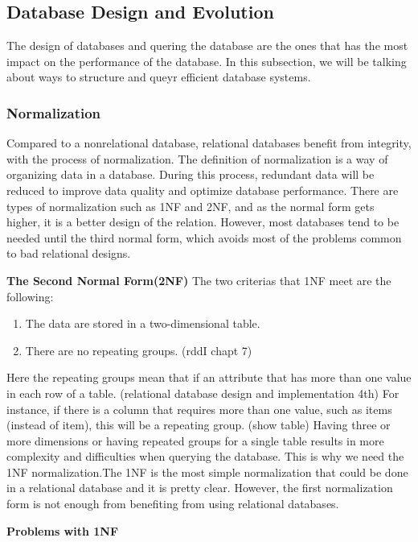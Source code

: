 \subsection{Database Design and Evolution}
The design of databases and quering the database are the ones that has the most impact on the performance of the database.
In this subsection, we will be talking about ways to structure and queyr efficient database systems.

\subsubsection[Normalization]{Normalization}
Compared to a nonrelational database, relational databases benefit from integrity, with the process of normalization. 
The definition of normalization is a way of organizing data in a database. 
During this process, redundant data will be reduced to improve data quality and optimize database performance. 
There are types of normalization such as 1NF and 2NF, and as the normal form gets higher, 
it is a better design of the relation. However, most databases tend to be needed until the third normal form, 
which avoids most of the problems common to bad relational designs. 

\textbf{The Second Normal Form(2NF)}
The two criterias that 1NF meet are the following:

\begin{enumerate}
    \item The data are stored in a two-dimensional table.
    \item There are no repeating groups. (rddI chapt 7)
\end{enumerate}


Here the repeating groups mean that if an attribute that has more than one value in each row of a table. (relational database design and implementation 4th) 
For instance, if there is a column that requires more than one value, such as items (instead of item), this will be a repeating group. (show table) 
Having three or more dimensions or having repeated groups for a single table results in more complexity and difficulties when querying the database. 
This is why we need the 1NF normalization.The 1NF is the most simple normalization that could be done in a relational database and it is pretty clear. 
However, the first normalization form is not enough from benefiting from using relational databases. 

\textbf{Problems with 1NF}

